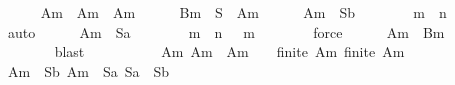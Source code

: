 \begin{isabellebody}
\ \ \ \ \isamarkupfalse%
\ {\isacharquery}Am\ {\isacharequal}\ {\isachardoublequoteopen}{\isacharquery}Am{\isacharprime}\ {\isasymunion}\ {\isacharquery}Am{\isacharprime}{\isacharprime}{\isachardoublequoteclose}\isanewline
\ \ \ \ \isamarkupfalse%
\ {\isacharquery}Bm\ {\isacharequal}\ {\isachardoublequoteopen}{\isacharquery}S\ {\isacharminus}\ {\isacharquery}Am{\isachardoublequoteclose}\isanewline
\isanewline
\ \ \ \ \isamarkupfalse%
\ {\isachardoublequoteopen}{\isacharquery}Am{\isacharprime}\ {\isasymsubseteq}\ {\isacharquery}Sb{\isachardoublequoteclose}\isanewline
\ \ \ \ \ \ \isamarkupfalse%
\ {\isacharbackquoteopen}m\ {\isasymle}\ n{\isacharbackquoteclose}\isanewline
\ \ \ \ \ \ \isamarkupfalse%
\ auto\isanewline
\isanewline
\ \ \ \ \isamarkupfalse%
\ {\isachardoublequoteopen}{\isacharquery}Am{\isacharprime}{\isacharprime}\ {\isasymsubseteq}\ {\isacharquery}Sa{\isachardoublequoteclose}\isanewline
\ \ \ \ \ \ \isamarkupfalse%
\ {\isacharbackquoteopen}m\ {\isasymle}\ n{\isacharbackquoteclose}\ {\isacharbackquoteopen}{}\ {\isasymle}\ m{\isacharbackquoteclose}\isanewline
\ \ \ \ \ \ \isamarkupfalse%
\ force\isanewline
\isanewline
\isanewline
\ \ \ \ \isamarkupfalse%
\ {\isachardoublequoteopen}{\isacharquery}Am\ {\isasyminter}\ {\isacharquery}Bm\ {\isacharequal}\ {\isacharbraceleft}{\isacharbraceright}{\isachardoublequoteclose}\isanewline
\ \ \ \ \ \ \isamarkupfalse%
\ blast\isanewline
\isanewline
\ \ \ \ \isamarkupfalse%
\isanewline
\isanewline
\ \ \ \ \isamarkupfalse%
\ Am{\isacharcolon}\ {\isachardoublequoteopen}{\isacharquery}Am{\isacharprime}\ {\isasyminter}\ {\isacharquery}Am{\isacharprime}{\isacharprime}\ {\isacharequal}\ {\isacharbraceleft}{\isacharbraceright}{\isachardoublequoteclose}\ \ {\isachardoublequoteopen}finite\ {\isacharquery}Am{\isacharprime}{\isachardoublequoteclose}\ {\isachardoublequoteopen}finite\ {\isacharquery}Am{\isacharprime}{\isacharprime}{\isachardoublequoteclose}\isanewline
\ \ \ \ \ \ \isamarkupfalse%
\ {\isacartoucheopen}{\isacharquery}Am{\isacharprime}\ {\isasymsubseteq}\ {\isacharquery}Sb{\isacartoucheclose}\ {\isacartoucheopen}{\isacharquery}Am{\isacharprime}{\isacharprime}\ {\isasymsubseteq}\ {\isacharquery}Sa{\isacartoucheclose}\ {\isacartoucheopen}{\isacharquery}Sa\ {\isasyminter}\ {\isacharquery}Sb\ {\isacharequal}\ {\isacharbraceleft}{\isacharbraceright}{\isacartoucheclose}\isanewline
\ \ \ \ \ \ \isamarkupfalse%

\end{isabellebody}
